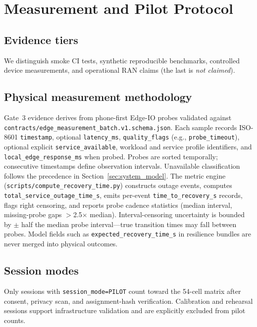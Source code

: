 \section{Measurement and Pilot Protocol}
\label{sec:measurement}

\subsection{Evidence tiers}
We distinguish smoke CI tests, synthetic reproducible benchmarks, controlled device measurements, and operational RAN claims (the last is \emph{not claimed}).

\subsection{Physical measurement methodology}
Gate~3 evidence derives from phone-first Edge-IO probes validated against \texttt{contracts/edge\_measurement\_batch.v1.schema.json}.
Each sample records ISO-8601 \texttt{timestamp}, optional \texttt{latency\_ms}, \texttt{quality\_flags} (e.g., \texttt{probe\_timeout}), optional explicit \texttt{service\_available}, workload and service profile identifiers, and \texttt{local\_edge\_response\_ms} when probed.
Probes are sorted temporally; consecutive timestamps define observation intervals.
Unavailable classification follows the precedence in Section~\ref{sec:system_model}.
The metric engine (\texttt{scripts/compute\_recovery\_time.py}) constructs outage events, computes \texttt{total\_service\_outage\_time\_s}, emits per-event \texttt{time\_to\_recovery\_s} records, flags right censoring, and reports probe cadence statistics (median interval, missing-probe gaps $>$2.5$\times$ median).
Interval-censoring uncertainty is bounded by $\pm$ half the median probe interval---true transition times may fall between probes.
Model fields such as \texttt{expected\_recovery\_time\_s} in resilience bundles are never merged into physical outcomes.

\subsection{Session modes}
Only sessions with \texttt{session\_mode=PILOT} count toward the 54-cell matrix after consent, privacy scan, and assignment-hash verification.
Calibration and rehearsal sessions support infrastructure validation and are explicitly excluded from pilot counts.

